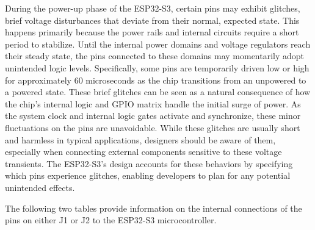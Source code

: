 During the power-up phase of the ESP32-S3, certain pins may exhibit glitches, brief voltage disturbances that deviate from their normal, expected state. This happens primarily because the power rails and internal circuits require a short period to stabilize. Until the internal power domains and voltage regulators reach their steady state, the pins connected to these domains may momentarily adopt unintended logic levels. Specifically, some pins are temporarily driven low or high for approximately 60 microseconds as the chip transitions from an unpowered to a powered state. These brief glitches can be seen as a natural consequence of how the chip's internal logic and GPIO matrix handle the initial surge of power. As the system clock and internal logic gates activate and synchronize, these minor fluctuations on the pins are unavoidable. While these glitches are usually short and harmless in typical applications, designers should be aware of them, especially when connecting external components sensitive to these voltage transients. The ESP32-S3’s design accounts for these behaviors by specifying which pins experience glitches, enabling developers to plan for any potential unintended effects.

The following two tables provide information on the internal connections of the pins on either J1 or J2 to the ESP32-S3 microcontroller.

